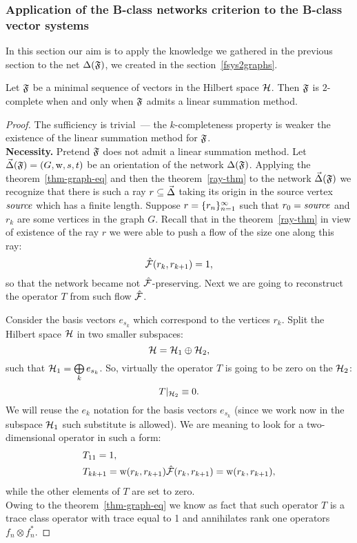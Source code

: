 \documentclass[12pt]{article}
\begin{document}
    \subsubsection{Application of the B-class networks criterion to the B-class vector systems}
      In this section our aim is to apply the knowledge we gathered in the previous section to
      the net $\net(\fsys)$, we created in the section~\ref{fsys2graphs}.
      \begin{theorem}
        \label{completeness-thm}
        Let $\fsys$ be a minimal sequence of vectors in the Hilbert space $\cal{H}$.
        Then $\fsys$ is $2$-complete when and only when $\fsys$ admits a linear summation method.
      \end{theorem}
      \begin{proof}
        The sufficiency is trivial~--- the $k$-completeness property is weaker the existence of the linear summation method
          for $\fsys$.\\
        \noindent\textbf{Necessity.}
        Pretend $\fsys$ does not admit a linear summation method.
        Let $\onet(\fsys) = (G, \wtp, s, t)$ be an orientation of the network $\net(\fsys)$.
        Applying the theorem~\ref{thm-graph-eq} and then the theorem~\ref{ray-thm} to the network $\onet(\fsys)$
          we recognize that there is such a ray $r \subseteq \onet$ taking its origin
          in the source vertex $\source$ which has a finite length.
        Suppose $r = \seq{r}$ such that $r_0 = \source$ and $r_k$ are some vertices in the graph $G$.
        Recall that in the theorem~\ref{ray-thm} in view of existence of the ray $r$ we were able to push
          a flow of the size one along this ray:
        \[
          \flow(r_k, r_{k+1}) = 1,
        \]
        so that the network became not $\flow$-preserving.
        Next we are going to reconstruct the operator $T$ from such flow $\flow$.

        Consider the basis vectors $e_{s_k}$ which correspond to the vertices $r_k$.
        Split the Hilbert space $\cal{H}$ in two smaller subspaces:
        \[
          \cal{H} = \cal{H}_1 \oplus \cal{H}_2,
        \]
        such that $\cal{H}_1 = \bigoplus\limits_k e_{s_k}$.
        So, virtually the operator $T$ is going to be zero on the $\cal{H}_2$:
        \[
          T\vert_{\cal{H}_2} \equiv 0.
        \]
        We will reuse the $e_k$ notation for the basis vectors $e_{s_k}$ (since we work now in the subspace $\cal{H}_1$
          such substitute is allowed).
        We are meaning to look for a two-dimensional operator in such a form:
        \begin{align*}
          &T_{11} = 1,\\
          &T_{k k+1} = \wtp(r_k, r_{k+1}) \flow(r_k, r_{k+1}) = \wtp(r_k, r_{k+1}),
        \end{align*}
        while the other elements of $T$ are set to zero.\\
        Owing to the theorem~\ref{thm-graph-eq} we know as fact that such operator $T$ is
          a trace class operator with trace equal to 1 and annihilates rank one operators $f_n \otimes f^{*}_n$.
    \end{proof}
\end{document}
